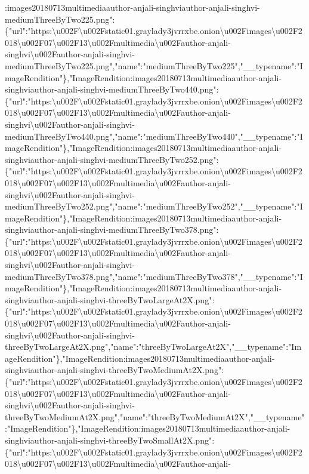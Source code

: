 :images20180713multimediaauthor-anjali-singhviauthor-anjali-singhvi-mediumThreeByTwo225.png":\{"url":"https:\textbackslash{}u002F\textbackslash{}u002Fstatic01.graylady3jvrrxbe.onion\textbackslash{}u002Fimages\textbackslash{}u002F2018\textbackslash{}u002F07\textbackslash{}u002F13\textbackslash{}u002Fmultimedia\textbackslash{}u002Fauthor-anjali-singhvi\textbackslash{}u002Fauthor-anjali-singhvi-mediumThreeByTwo225.png","name":"mediumThreeByTwo225","\_\_typename":"ImageRendition"\},"ImageRendition:images20180713multimediaauthor-anjali-singhviauthor-anjali-singhvi-mediumThreeByTwo440.png":\{"url":"https:\textbackslash{}u002F\textbackslash{}u002Fstatic01.graylady3jvrrxbe.onion\textbackslash{}u002Fimages\textbackslash{}u002F2018\textbackslash{}u002F07\textbackslash{}u002F13\textbackslash{}u002Fmultimedia\textbackslash{}u002Fauthor-anjali-singhvi\textbackslash{}u002Fauthor-anjali-singhvi-mediumThreeByTwo440.png","name":"mediumThreeByTwo440","\_\_typename":"ImageRendition"\},"ImageRendition:images20180713multimediaauthor-anjali-singhviauthor-anjali-singhvi-mediumThreeByTwo252.png":\{"url":"https:\textbackslash{}u002F\textbackslash{}u002Fstatic01.graylady3jvrrxbe.onion\textbackslash{}u002Fimages\textbackslash{}u002F2018\textbackslash{}u002F07\textbackslash{}u002F13\textbackslash{}u002Fmultimedia\textbackslash{}u002Fauthor-anjali-singhvi\textbackslash{}u002Fauthor-anjali-singhvi-mediumThreeByTwo252.png","name":"mediumThreeByTwo252","\_\_typename":"ImageRendition"\},"ImageRendition:images20180713multimediaauthor-anjali-singhviauthor-anjali-singhvi-mediumThreeByTwo378.png":\{"url":"https:\textbackslash{}u002F\textbackslash{}u002Fstatic01.graylady3jvrrxbe.onion\textbackslash{}u002Fimages\textbackslash{}u002F2018\textbackslash{}u002F07\textbackslash{}u002F13\textbackslash{}u002Fmultimedia\textbackslash{}u002Fauthor-anjali-singhvi\textbackslash{}u002Fauthor-anjali-singhvi-mediumThreeByTwo378.png","name":"mediumThreeByTwo378","\_\_typename":"ImageRendition"\},"ImageRendition:images20180713multimediaauthor-anjali-singhviauthor-anjali-singhvi-threeByTwoLargeAt2X.png":\{"url":"https:\textbackslash{}u002F\textbackslash{}u002Fstatic01.graylady3jvrrxbe.onion\textbackslash{}u002Fimages\textbackslash{}u002F2018\textbackslash{}u002F07\textbackslash{}u002F13\textbackslash{}u002Fmultimedia\textbackslash{}u002Fauthor-anjali-singhvi\textbackslash{}u002Fauthor-anjali-singhvi-threeByTwoLargeAt2X.png","name":"threeByTwoLargeAt2X","\_\_typename":"ImageRendition"\},"ImageRendition:images20180713multimediaauthor-anjali-singhviauthor-anjali-singhvi-threeByTwoMediumAt2X.png":\{"url":"https:\textbackslash{}u002F\textbackslash{}u002Fstatic01.graylady3jvrrxbe.onion\textbackslash{}u002Fimages\textbackslash{}u002F2018\textbackslash{}u002F07\textbackslash{}u002F13\textbackslash{}u002Fmultimedia\textbackslash{}u002Fauthor-anjali-singhvi\textbackslash{}u002Fauthor-anjali-singhvi-threeByTwoMediumAt2X.png","name":"threeByTwoMediumAt2X","\_\_typename":"ImageRendition"\},"ImageRendition:images20180713multimediaauthor-anjali-singhviauthor-anjali-singhvi-threeByTwoSmallAt2X.png":\{"url":"https:\textbackslash{}u002F\textbackslash{}u002Fstatic01.graylady3jvrrxbe.onion\textbackslash{}u002Fimages\textbackslash{}u002F2018\textbackslash{}u002F07\textbackslash{}u002F13\textbackslash{}u002Fmultimedia\textbackslash{}u002Fauthor-anjali-